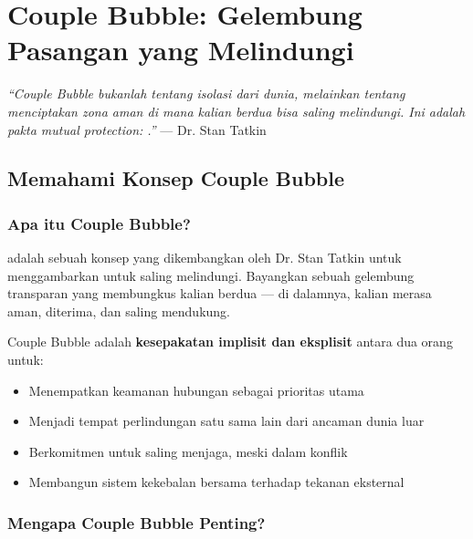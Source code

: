 \chapter{Couple Bubble: Gelembung Pasangan yang Melindungi}

\begin{insightbox}
\textit{``Couple Bubble bukanlah tentang isolasi dari dunia, melainkan tentang menciptakan zona aman di mana kalian berdua bisa saling melindungi. Ini adalah pakta mutual protection: .''} --- Dr. Stan Tatkin
\end{insightbox}

\section{Memahami Konsep Couple Bubble}

\subsection{Apa itu Couple Bubble?}

 adalah sebuah konsep yang dikembangkan oleh Dr. Stan Tatkin untuk menggambarkan  untuk saling melindungi. Bayangkan sebuah gelembung transparan yang membungkus kalian berdua --- di dalamnya, kalian merasa aman, diterima, dan saling mendukung.

\begin{praktikbox}
Couple Bubble adalah \textbf{kesepakatan implisit dan eksplisit} antara dua orang untuk:
\begin{itemize}
    \item Menempatkan keamanan hubungan sebagai prioritas utama
    \item Menjadi tempat perlindungan satu sama lain dari ancaman dunia luar
    \item Berkomitmen untuk saling menjaga, meski dalam konflik
    \item Membangun sistem kekebalan bersama terhadap tekanan eksternal
\end{itemize}
\end{praktikbox}

\subsection{Mengapa Couple Bubble Penting?}

